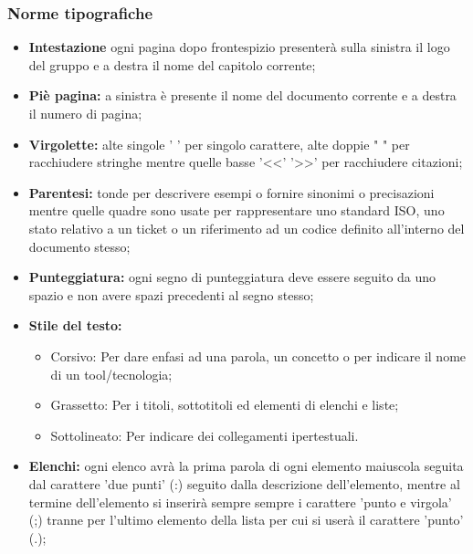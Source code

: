 \documentclass[NormeDiProgetto.tex]{subfiles}
\begin{document}
	\subsubsection{Norme tipografiche}
		\begin{itemize}
			\item \textbf{Intestazione} ogni pagina dopo frontespizio presenterà sulla sinistra il logo del gruppo e a destra il nome del capitolo corrente;
			
			\item \textbf{Piè pagina:} a sinistra è presente il nome del documento corrente e a destra il numero di pagina; 
			
			\item \textbf{Virgolette:} alte singole ' ' per singolo carattere, alte doppie " " per racchiudere stringhe mentre quelle basse '\textless \textless ' '\textgreater \textgreater ' per racchiudere citazioni;
			 
			\item \textbf{Parentesi:} tonde per descrivere esempi o fornire sinonimi o precisazioni mentre quelle quadre sono usate per rappresentare uno standard ISO, uno stato relativo a un ticket o un riferimento ad un codice definito all'interno del documento stesso;
			
			\item \textbf{Punteggiatura:} ogni segno di punteggiatura deve essere seguito da uno spazio e non avere spazi precedenti al segno stesso;

			\item \textbf{Stile del testo:} 
			\begin{itemize}
				\item Corsivo: Per dare enfasi ad una parola, un concetto o per indicare il nome di un tool/tecnologia;
				\item Grassetto: Per i titoli, sottotitoli ed elementi di elenchi e liste;
				\item Sottolineato: Per indicare dei collegamenti ipertestuali.
			\end{itemize}
		
			\item \textbf{Elenchi:} ogni elenco avrà la prima parola di ogni elemento maiuscola seguita dal carattere 'due punti' (:) seguito dalla descrizione dell'elemento, mentre al termine dell'elemento si inserirà sempre sempre i carattere 'punto e virgola' (;) tranne per l'ultimo elemento della lista per cui si userà il carattere 'punto' (.);
			 

\end{itemize}
\end{document}
